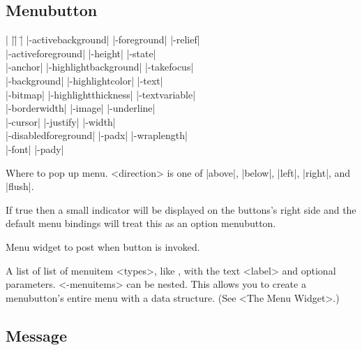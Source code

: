 \subsection*{Menubutton}
\vspace{-4pt}

\begin{tabbing}
|                    |\=|                    |\= \kill
|-activebackground| \> |-foreground|         \> |-relief| \\
|-activeforeground| \> |-height|             \> |-state| \\
|-anchor|           \> |-highlightbackground|\> |-takefocus| \\
|-background|       \> |-highlightcolor|     \> |-text| \\
|-bitmap|           \> |-highlightthickness| \> |-textvariable| \\
|-borderwidth|      \> |-image|              \> |-underline| \\
|-cursor|           \> |-justify|            \> |-width| \\
|-disabledforeground| \> |-padx| 	     \> |-wraplength| \\
|-font| 	    \> |-pady| \\
\end{tabbing}

\vskip5pt
\begin{enum}{1cm}

Where to pop up menu. <direction> is one of |above|, |below|,
|left|, |right|, and |flush|.

If true then a small indicator will be displayed on the buttons's
right side and the default menu bindings will treat this as an option
menubutton.

Menu widget to post when button is invoked.

A list of list of menuitem <types>, like , with the text
<label> and optional parameters.  <-menuitems> can be nested.  This
allows you to create a menubutton's entire menu with a data structure.
(See <The Menu Widget>.)

\end{enum}

\subsection*{Message}
\vspace{-4pt}

